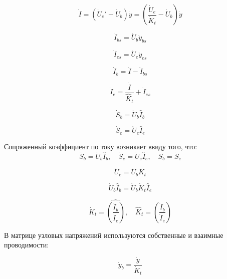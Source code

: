 \documentclass[]{article}
\begin{document}
	

\begin {equation}
\dot{I}=(\dot{U}_e' - \dot{U}_b)\dot{y}=\left(\frac{\dot{U}_e}{\dot{K}_t}-\dot{U}_b \right) \dot{y}
\end {equation}

\begin {equation}
\dot{I}_{bs}=\dot{U}_b\dot{y}_{bs}
\end {equation}

\begin {equation}
\dot{I}_{es}=\dot{U}_e\dot{y}_{es}
\end {equation}

\begin {equation}
\dot{I}_b = \dot{I} - \dot{I}_{bs}
\end {equation}

\begin {equation}
\dot{I}_e = \frac{\dot{I}}{\hat{K}_t} + \dot{I}_{es}
\end {equation}

\begin {equation}
\dot{S}_b = \dot{U}_b\hat{I}_b
\end {equation}


\begin {equation}
\dot{S}_e = \dot{U}_e\hat{I}_e
\end {equation}


Сопряженный коэффициент по току возникает ввиду того, что:
\begin {equation}
\dot{S}_b = \dot{U}_b\hat{I}_b, \quad \dot{S}_e = \dot{U}_e\hat{I}_e, \quad \dot{S}_b=\dot{S}_e
\end {equation}

\begin {equation}
\dot{U}_e = \dot{U}_b\dot{K}_t
\end {equation}

\begin {equation}
\dot{U}_b\hat{I}_b = \dot{U}_b\dot{K}_t\hat{I}_e
\end {equation}

\begin {equation}
\dot{K}_t = \hat{\left(\frac{\dot{I}_b}{\dot{I}_e}\right)}, \quad
\hat{K}_t = {\left(\frac{\dot{I}_b}{\dot{I}_e}\right)}
\end {equation}

В матрице узловых напряжений используются собственные и взаимные проводимости:

\begin {equation}
\dot{y}_b = \frac{\dot{y}}{\dot{K}_t}
\end {equation}
\end{document}
